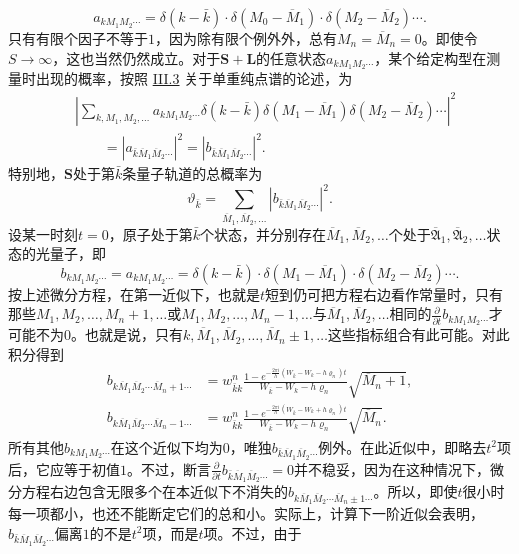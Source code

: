 \documentclass[fontsize=13pt,twoside,openany,headings=normal,parskip=false,bookmarkpackage=false,DIV=calc]{scrbook}
\begin{document}
\[
 a_{kM_1M_2\cdots}=\delta(k-\bar k)\cdot\delta(M_0-\overline M_1)\cdot\delta(M_2-\overline M_2)\cdots.
\]
只有有限个因子不等于$1$，因为除有限个例外外，总有$M_n=\overline M_n=0$。即使令$S\longrightarrow\infty$，这也当然仍然成立。对于$\boldsymbol{S}+\boldsymbol{L}$的任意状态$a_{kM_1M_2\cdots}$，某个给定构型在测量时出现的概率，按照 \hyperref[sec:III.3]{III.3} 关于单重纯点谱的论述，为
\begin{align*}
 &\left|\sum_{k,M_1,M_2,\ldots}a_{kM_1M_2\cdots}
 \delta(k-\bar k)\delta(M_1-\overline M_1)\delta(M_2-\overline M_2)\cdots\right|^2\\
 &\qquad=|a_{\bar k\overline M_1\overline M_2\cdots}|^2
 =|b_{\bar k\overline M_1\overline M_2\cdots}|^2.
\end{align*}
特别地，$\boldsymbol{S}$处于第$\bar k$条量子轨道的总概率为
\[
 \vartheta_{\bar k}=\sum_{\overline M_1,\overline M_2,\ldots}
 |b_{\bar k\overline M_1\overline M_2\cdots}|^2.
\]
设某一时刻$t=0$，原子处于第$\bar k$个状态，并分别存在$\overline M_1,\allowbreak \overline M_2,\allowbreak \ldots$个处于$\overline{\mathfrak A}_1,\allowbreak \overline{\mathfrak A}_2,\allowbreak \ldots$状态的光量子，即
\[
 b_{kM_1M_2\cdots}=a_{kM_1M_2\cdots}
 =\delta(k-\bar k)\cdot\delta(M_1-\overline M_1)\cdot\delta(M_2-\overline M_2)\cdots.
\]
按上述微分方程，在第一近似下，也就是$t$短到仍可把方程右边看作常量时，\hypertarget{origpage-152}{}\label{origpage-152}只有那些$M_1,\allowbreak M_2,\allowbreak \ldots,\allowbreak M_n+1,\allowbreak \ldots$或$M_1,\allowbreak M_2,\allowbreak \ldots,\allowbreak M_n-1,\allowbreak \ldots$与$\overline M_1,\allowbreak \overline M_2,\allowbreak \ldots$相同的$\frac\partial{\partial t}b_{kM_1M_2\cdots}$才可能不为$0$。也就是说，只有$k,\allowbreak \overline M_1,\allowbreak \overline M_2,\allowbreak \ldots,\allowbreak \overline M_n\pm1,\allowbreak \ldots$这些指标组合有此可能。对此积分得到
\begin{align*}
 b_{k\overline M_1\overline M_2\cdots\overline M_n+1\cdots}
 &=w_{\bar k k}^n\frac{1-e^{-\frac{2\pi i}{h}(W_{\bar k}-W_k-h\varrho_n)t}}
 {W_{\bar k}-W_k-h\varrho_n}\sqrt{\overline M_n+1},\\
 b_{k\overline M_1\overline M_2\cdots\overline M_n-1\cdots}
 &=w_{\bar k k}^n\frac{1-e^{-\frac{2\pi i}{h}(W_{\bar k}-W_k+h\varrho_n)t}}
 {W_{\bar k}-W_k-h\varrho_n}\sqrt{\overline M_n}.
\end{align*}
所有其他$b_{kM_1M_2\cdots}$在这个近似下均为$0$，唯独$b_{\bar k\overline M_1\overline M_2\cdots}$例外。在此近似中，即略去$t^2$项后，它应等于初值$1$。不过，断言$\frac\partial{\partial t}b_{\bar k\overline M_1\overline M_2\cdots}=0$并不稳妥，因为在这种情况下，微分方程右边包含无限多个在本近似下不消失的$b_{k\overline M_1\overline M_2\cdots\overline M_n\pm1\cdots}$。所以，即使$t$很小时每一项都小，也还不能断定它们的总和小。实际上，计算下一阶近似会表明，$b_{\bar k\overline M_1\overline M_2\cdots}$偏离$1$的不是$t^2$项，而是$t$项。不过，由于
\end{document}
